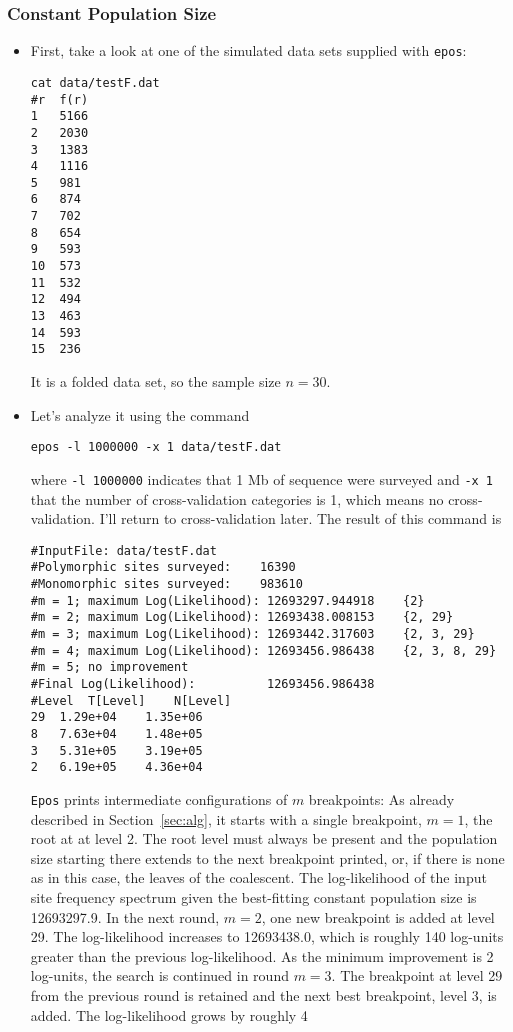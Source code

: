 \documentclass[a4paper, english]{article}
\newcommand{\ty}{\texttt}
\begin{document}
\subsubsection{Constant Population Size}
\begin{itemize}
\item First, take a look at one of the simulated data sets supplied
  with \ty{epos}:
\begin{verbatim}
cat data/testF.dat 
#r	f(r)
1	5166
2	2030
3	1383
4	1116
5	981
6	874
7	702
8	654
9	593
10	573
11	532
12	494
13	463
14	593
15	236
\end{verbatim}
It is a folded data set, so the sample size $n=30$.
\item Let's analyze it using the command
\begin{verbatim}
epos -l 1000000 -x 1 data/testF.dat 
\end{verbatim}
where \ty{-l 1000000} indicates that 1 Mb of sequence were surveyed
and \ty{-x 1} that the number of cross-validation categories is 1,
which means no cross-validation. I'll return to cross-validation
later. The result of this command is
\begin{verbatim}
#InputFile:	data/testF.dat
#Polymorphic sites surveyed:	16390
#Monomorphic sites surveyed:	983610
#m = 1; maximum Log(Likelihood): 12693297.944918	{2}
#m = 2; maximum Log(Likelihood): 12693438.008153	{2, 29}
#m = 3; maximum Log(Likelihood): 12693442.317603	{2, 3, 29}
#m = 4; maximum Log(Likelihood): 12693456.986438	{2, 3, 8, 29}
#m = 5; no improvement
#Final Log(Likelihood):          12693456.986438
#Level	T[Level]	N[Level]
29	1.29e+04	1.35e+06
8	7.63e+04	1.48e+05
3	5.31e+05	3.19e+05
2	6.19e+05	4.36e+04
\end{verbatim}
\ty{Epos} prints intermediate configurations of $m$ breakpoints: As
already described in Section~\ref{sec:alg}, it starts with a single
breakpoint, $m=1$, the root at at level 2. The root level must always
be present and the population size starting there extends to the next
breakpoint printed, or, if there is none as in this case, the
leaves of the coalescent. The log-likelihood of the input site frequency spectrum given
the best-fitting constant population size is 12693297.9. In the next
round, $m=2$, one new breakpoint is added at level 29. The
log-likelihood increases to 12693438.0, which is roughly 140 log-units
greater than the previous log-likelihood. As the minimum improvement
is 2 log-units, the search is continued in round $m=3$. The breakpoint
at level 29 from the previous round is retained and the next best
breakpoint, level 3, is added. The log-likelihood grows by roughly 4

\end{itemize}
\end{document}
